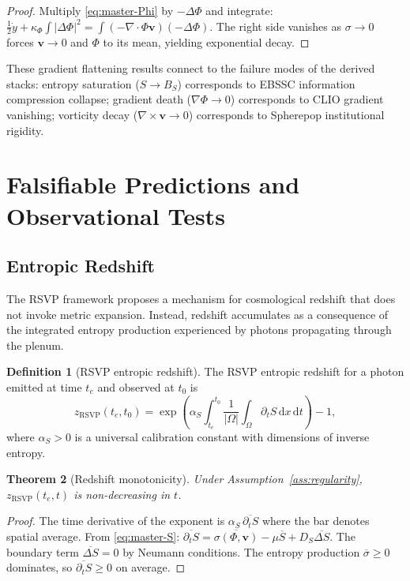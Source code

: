 \documentclass[12pt, a4paper]{article}
\theoremstyle{plain}
\newtheorem{theorem}{Theorem}[section]
\theoremstyle{definition}
\newtheorem{definition}[theorem]{Definition}
\theoremstyle{remark}
\newcommand{\vfield}{\mathbf{v}}
\begin{document}
\begin{proof}
Multiply \eqref{eq:master-Phi} by $-\Delta\Phi$ and integrate:
$\tfrac{1}{2}\dot{y} + \kappa_\Phi\int|\Delta\Phi|^2 = \int(-\nabla\cdot\Phi\vfield)(-\Delta\Phi)$.
The right side vanishes as $\sigma\to 0$ forces $\vfield\to 0$ and $\Phi$ to its mean,
yielding exponential decay.
\end{proof}

These gradient flattening results connect to the failure modes of the derived stacks:
entropy saturation ($S \to B_S$) corresponds to EBSSC information compression collapse;
gradient death ($\nabla\Phi \to 0$) corresponds to CLIO gradient vanishing; vorticity
decay ($\nabla\times\vfield \to 0$) corresponds to Spherepop institutional rigidity.

\section{Falsifiable Predictions and Observational Tests}
\label{sec:predictions}

\subsection{Entropic Redshift}

The RSVP framework proposes a mechanism for cosmological redshift that does not invoke
metric expansion.  Instead, redshift accumulates as a consequence of the integrated
entropy production experienced by photons propagating through the plenum.

\begin{definition}[RSVP entropic redshift]
\label{def:redshift}
The RSVP entropic redshift for a photon emitted at time $t_e$ and observed at $t_0$ is
\[
z_{\mathrm{RSVP}}(t_e, t_0) = \exp\!\left(\alpha_S\int_{t_e}^{t_0}
\frac{1}{|\Omega|}\int_\Omega \partial_t S\,\mathrm{d}x\,\mathrm{d}t\right) - 1,
\]
where $\alpha_S > 0$ is a universal calibration constant with dimensions of inverse entropy.
\end{definition}

\begin{theorem}[Redshift monotonicity]
Under Assumption~\ref{ass:regularity}, $z_{\mathrm{RSVP}}(t_e, t)$ is non-decreasing in $t$.
\end{theorem}

\begin{proof}
The time derivative of the exponent is $\alpha_S\,\overline{\partial_t S}$ where the bar
denotes spatial average.  From \eqref{eq:master-S}: $\overline{\partial_t S} = \overline{\sigma(\Phi,\vfield)} - \mu\overline{S} + D_S\overline{\Delta S}$.
The boundary term $\overline{\Delta S} = 0$ by Neumann conditions.  The entropy production
$\overline{\sigma} \geq 0$ dominates, so $\overline{\partial_t S} \geq 0$ on average.
\end{proof}
\end{document}
